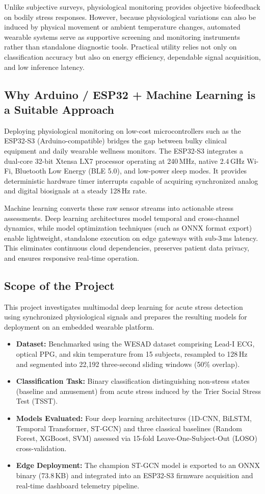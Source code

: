 \documentclass[11pt,a4paper]{article}
\begin{document}
Unlike subjective surveys, physiological monitoring provides objective biofeedback on bodily stress responses. However, because physiological variations can also be induced by physical movement or ambient temperature changes, automated wearable systems serve as supportive screening and monitoring instruments rather than standalone diagnostic tools. Practical utility relies not only on classification accuracy but also on energy efficiency, dependable signal acquisition, and low inference latency.

\subsection{Why Arduino / ESP32 + Machine Learning is a Suitable Approach}
Deploying physiological monitoring on low-cost microcontrollers such as the ESP32-S3 (Arduino-compatible) bridges the gap between bulky clinical equipment and daily wearable wellness monitors. The ESP32-S3 integrates a dual-core 32-bit Xtensa LX7 processor operating at 240\,MHz, native 2.4\,GHz Wi-Fi, Bluetooth Low Energy (BLE 5.0), and low-power sleep modes. It provides deterministic hardware timer interrupts capable of acquiring synchronized analog and digital biosignals at a steady 128\,Hz rate.

Machine learning converts these raw sensor streams into actionable stress assessments. Deep learning architectures model temporal and cross-channel dynamics, while model optimization techniques (such as ONNX format export) enable lightweight, standalone execution on edge gateways with sub-3\,ms latency. This eliminates continuous cloud dependencies, preserves patient data privacy, and ensures responsive real-time operation.

\subsection{Scope of the Project}
This project investigates multimodal deep learning for acute stress detection using synchronized physiological signals and prepares the resulting models for deployment on an embedded wearable platform. 
\begin{itemize}
    \item \textbf{Dataset:} Benchmarked using the WESAD dataset comprising Lead-I ECG, optical PPG, and skin temperature from 15 subjects, resampled to 128\,Hz and segmented into 22,192 three-second sliding windows (50\% overlap).
    \item \textbf{Classification Task:} Binary classification distinguishing non-stress states (baseline and amusement) from acute stress induced by the Trier Social Stress Test (TSST).
    \item \textbf{Models Evaluated:} Four deep learning architectures (1D-CNN, BiLSTM, Temporal Transformer, ST-GCN) and three classical baselines (Random Forest, XGBoost, SVM) assessed via 15-fold Leave-One-Subject-Out (LOSO) cross-validation.
    \item \textbf{Edge Deployment:} The champion ST-GCN model is exported to an ONNX binary (73.8\,KB) and integrated into an ESP32-S3 firmware acquisition and real-time dashboard telemetry pipeline.
\end{itemize}
\end{document}

